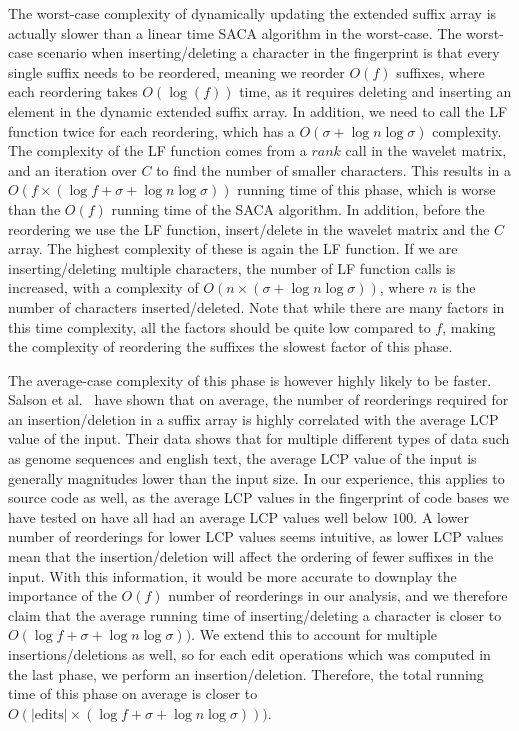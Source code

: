 The worst-case complexity of dynamically updating the extended suffix array is actually
slower than a linear time SACA algorithm in the worst-case. The worst-case scenario when
inserting/deleting a character in the fingerprint is that every single suffix needs to be
reordered, meaning we reorder $O(f)$ suffixes, where each reordering takes $O(\log(f))$
time, as it requires deleting and inserting an element in the dynamic extended suffix
array. In addition, we need to call the LF function twice for each reordering, which has a
$O(\sigma + \log n \log\sigma)$ complexity. The complexity of the LF function comes from a
$rank$ call in the wavelet matrix, and an iteration over $C$ to find the number of smaller
characters. This results in a $O(f \times (\log f + \sigma + \log n \log\sigma))$ running
time of this phase, which is worse than the $O(f)$ running time of the SACA algorithm. In
addition, before the reordering we use the LF function, insert/delete in the wavelet
matrix and the $C$ array. The highest complexity of these is again the LF function. If we
are inserting/deleting multiple characters, the number of LF function calls is increased,
with a complexity of $O(n \times (\sigma + \log n \log\sigma))$, where $n$ is the
number of characters inserted/deleted. Note that while there are many factors in this time
complexity, all the factors should be quite low compared to $f$, making the complexity of
reordering the suffixes the slowest factor of this phase.

The average-case complexity of this phase is however highly likely to be faster. Salson et
al.~\cite{DynamicExtendedSuffixArraysReorderings} have shown that on average, the number
of reorderings required for an insertion/deletion in a suffix array is highly correlated
with the average LCP value of the input. Their data shows that for multiple different
types of data such as genome sequences and english text, the average LCP value of the
input is generally magnitudes lower than the input size. In our experience, this applies
to source code as well, as the average LCP values in the fingerprint of code bases we have
tested on have all had an average LCP values well below $100$. A lower number of
reorderings for lower LCP values seems intuitive, as lower LCP values mean that the
insertion/deletion will affect the ordering of fewer suffixes in the input. With this
information, it would be more accurate to downplay the importance of the $O(f)$ number of
reorderings in our analysis, and we therefore claim that the average running time of
inserting/deleting a character is closer to $O(\log f + \sigma + \log n \log\sigma))$. We
extend this to account for multiple insertions/deletions as well, so for each edit
operations which was computed in the last phase, we perform an insertion/deletion.
Therefore, the total running time of this phase on average is closer to
$O(\vert\text{edits}\vert \times (\log f + \sigma + \log n \log\sigma)))$.

